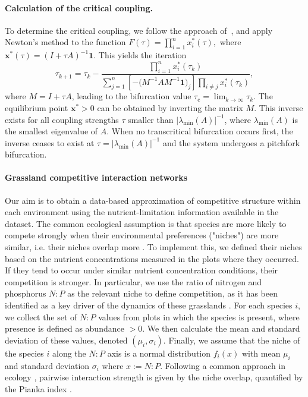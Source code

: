 \documentclass[a4paper,12pt]{article}
\begin{document}
\paragraph{Calculation of the critical coupling.}
To determine the critical coupling, we follow the approach of~\cite{mooij2024findinglargeindependentsets}, and apply Newton's method to the function $F(\tau) = \prod_{i=1}^{n} x_i^*(\tau),$
where
$\mathbf{x}^*(\tau) = (I + \tau A)^{-1}\mathbf{1}.$
This yields the iteration
\begin{equation}
    \tau_{k+1}= \tau_k-\frac{\prod\limits_{i=1}^{n} x_i^*(\tau_k)}{\sum\limits_{j=1}^{n}
        \left[-\bigl(M^{-1}AM^{-1}\mathbf{1}\bigr)_j\right]\prod\limits_{i \neq j} x_i^*(\tau_k)},
\end{equation}
where $M = I + \tau A$, leading to the bifurcation value $\tau_{\text{c}} = \lim_{k \to \infty} \tau_k$. The equilibrium point $\mathbf{x}^* > 0$ can be obtained by inverting the matrix $M$. This inverse exists for all coupling strengths $\tau$ smaller than $|\lambda_{\min}(A)|^{-1}$,
where $\lambda_{\min}(A)$ is the smallest eigenvalue of $A$. When no transcritical bifurcation occurs first, the inverse ceases to exist at $\tau = |\lambda_{\min}(A)|^{-1}$ and the system undergoes a pitchfork bifurcation.

\paragraph{Grassland competitive interaction networks}
Our aim is to obtain a data-based approximation of competitive structure within each environment using the nutrient-limitation information available in the dataset. The common ecological assumption is that species are more likely to compete strongly when their environmental preferences ("niches") are more similar, i.e. their niches overlap more \cite{wandrag2019quantifying,chesson2000mechanisms}. To implement this, we defined their niches based on the nutrient concentrations measured in the plots where they occurred. If they tend to occur under similar nutrient concentration conditions, their competition is stronger. In particular,  we use the ratio of nitrogen and phosphorus $N:P$ as the relevant niche to define competition, as it has been identified as a key driver of the dynamics of these grasslands \cite{fay2015grassland,gusewell2004n,olde2003species}. For each species $i$, we collect the set of $N:P$ values from plots in which the species is present, where presence is defined as abundance $>0$. We then calculate the mean and standard deviation of these values, denoted $(\mu_i,\sigma_i)$. Finally, we assume that the niche of the species $i$  along the $N:P$ axis is a normal distribution $f_i(x)$ with mean $\mu_i$ and standard deviation $\sigma_i$ where $x := N:P$. Following a common approach in ecology \cite{haraldsson2023emerging,mason2005functional}, pairwise interaction strength is given by the niche overlap, quantified by the Pianka index \cite{pianka1973structure}.
\end{document}
